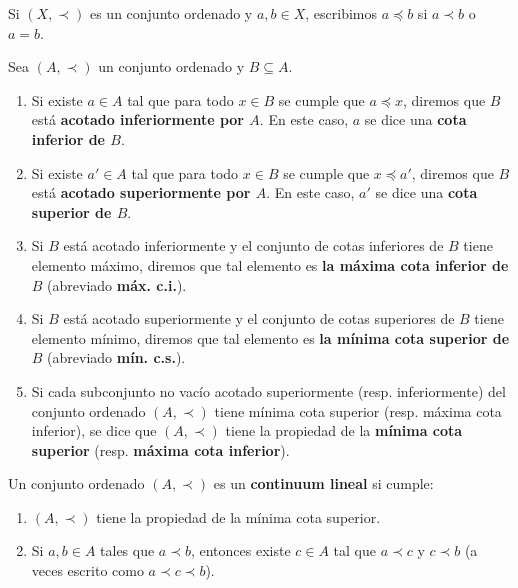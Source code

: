 \documentclass[12pt]{report}
\theoremstyle{largebreak}
\begin{document}
    \begin{obs}
        Si $(X,\prec)$ es un conjunto ordenado y $a,b\in X$, escribimos $a\preceq b$ si $a\prec b$ o $a=b$.
    \end{obs}

    \begin{mydef}
        Sea $(A,\prec)$ un conjunto ordenado y $B\subseteq A$. 
        \begin{enumerate}
            \item Si existe $a\in A$ tal que para todo $x\in B$ se cumple que $a\preceq x$, diremos que $B$ está \textbf{acotado inferiormente por $A$}. En este caso, $a$ se dice una \textbf{cota inferior de $B$}.
            \item Si existe $a'\in A$ tal que para todo $x\in B$ se cumple que $x\preceq a'$, diremos que $B$ está \textbf{acotado superiormente por $A$}. En este caso, $a'$ se dice una \textbf{cota superior de $B$}.
            \item Si $B$ está acotado inferiormente y el conjunto de cotas inferiores de $B$ tiene elemento máximo, diremos que tal elemento es \textbf{la máxima cota inferior de $B$} (abreviado \textbf{máx. c.i.}).
            \item Si $B$ está acotado superiormente y el conjunto de cotas superiores de $B$ tiene elemento mínimo, diremos que tal elemento es \textbf{la mínima cota superior de $B$} (abreviado \textbf{mín. c.s.}).
            \item Si cada subconjunto no vacío acotado superiormente (resp. inferiormente) del conjunto ordenado $(A,\prec)$ tiene mínima cota superior (resp. máxima cota inferior), se dice que $(A,\prec)$ tiene la propiedad de la \textbf{mínima cota superior} (resp. \textbf{máxima cota inferior}).
        \end{enumerate}
    \end{mydef}

    \begin{mydef}
        Un conjunto ordenado $(A,\prec)$ es un \textbf{continuum lineal} si cumple:
        \begin{enumerate}
            \item $(A,\prec)$ tiene la propiedad de la mínima cota superior.
            \item Si $a,b\in A$ tales que $a\prec b$, entonces existe $c\in A$ tal que $a\prec c$ y $c\prec b$ (a veces escrito como $a\prec c\prec b$).
        \end{enumerate}
    \end{mydef}
\end{document}
